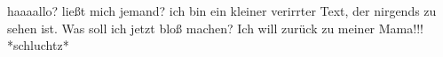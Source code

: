 


















haaaallo? ließt mich jemand?
ich bin ein kleiner verirrter Text, der nirgends zu sehen ist.
Was soll ich jetzt bloß machen? Ich will zurück zu meiner Mama!!! *schluchtz*

